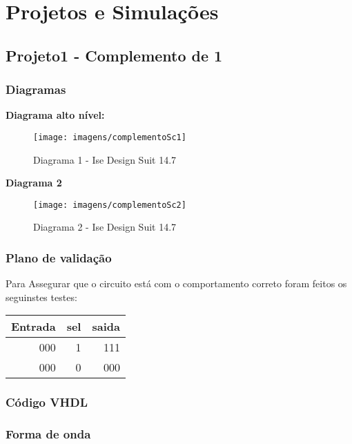 \documentclass[12pts]{article}
\begin{document}
\section{Projetos e Simulações}
\subsection{Projeto1 - Complemento de 1}
\subsubsection{Diagramas}

\textbf{Diagrama alto nível:}

\begin{figure}[!htb]
  \centering
  \texttt{[image: imagens/complementoSc1]}
  \caption{Diagrama 1 - Ise Design Suit 14.7}
  \label{figRotulo}
\end{figure}

\newpage
\textbf{Diagrama 2 }

\begin{figure}[!htb]
  \centering
  \texttt{[image: imagens/complementoSc2]}
  \caption{Diagrama 2 - Ise Design Suit 14.7}
  \label{figRotulo}
\end{figure}


\subsubsection{Plano de validação}

Para Assegurar que o circuito está com o comportamento correto foram feitos os seguinstes testes:

\begin{center}
	\begin{tabular}{|r|r|r|}
		\hline
		Entrada & sel & saida \\
		\hline
		000 & 1 & 111 \\
		\hline
		000 & 0 & 000 \\
		\hline
	\end{tabular}
\end{center}

\newpage
\subsubsection{Código VHDL}



\newpage
\subsubsection{Forma de onda}
\end{document}
